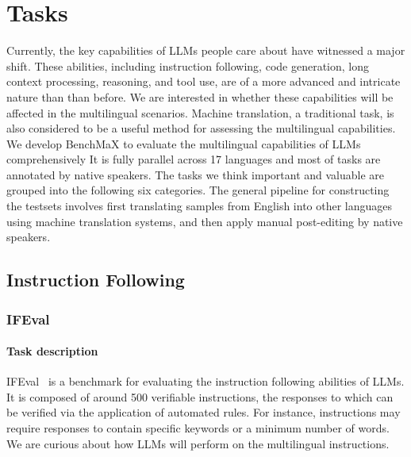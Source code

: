 \section{Tasks}
Currently, the key capabilities of LLMs people care about have witnessed a major shift.
These abilities, including instruction following, code generation, long context processing, reasoning, and tool use, are of a more advanced and intricate nature than than before.
We are interested in whether these capabilities will be affected in the multilingual scenarios.
Machine translation, a traditional task, is also considered to be a useful method for assessing the multilingual capabilities.
We develop BenchMaX to evaluate the multilingual capabilities of LLMs comprehensively
It is fully parallel across 17 languages and most of tasks are annotated by native speakers.
The tasks we think important and valuable are grouped into the following six categories.
The general pipeline for constructing the testsets involves first translating samples from English into other languages using machine translation systems, and then apply manual post-editing by native speakers.

\subsection{Instruction Following}
\subsubsection{IFEval}
\paragraph{Task description}
IFEval~\cite{zhou2023instruction} is a benchmark for evaluating the instruction following abilities of LLMs. 
It is composed of around 500 verifiable instructions, the responses to which can be verified via the application of automated rules.
For instance, instructions may require responses to contain specific keywords or a minimum number of words.
We are curious about how LLMs will perform on the multilingual instructions.

